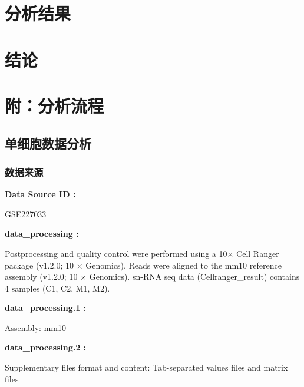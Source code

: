 \documentclass[
]{article}
\begin{document}
\hypertarget{results}{%
\section{分析结果}\label{results}}

\hypertarget{dis}{%
\section{结论}\label{dis}}

\hypertarget{workflow}{%
\section{附：分析流程}\label{workflow}}

\hypertarget{ux5355ux7ec6ux80deux6570ux636eux5206ux6790}{%
\subsection{单细胞数据分析}\label{ux5355ux7ec6ux80deux6570ux636eux5206ux6790}}

\hypertarget{ux6570ux636eux6765ux6e90}{%
\subsubsection{数据来源}\label{ux6570ux636eux6765ux6e90}}

\begin{center}\begin{tcolorbox}[colback=gray!10, colframe=gray!50, width=0.9\linewidth, arc=1mm, boxrule=0.5pt]
\textbf{
Data Source ID
:}

\vspace{0.5em}

    GSE227033

\vspace{2em}


\textbf{
data\_processing
:}

\vspace{0.5em}

    Postprocessing and quality control were performed using
a 10× Cell Ranger package (v1.2.0; 10 × Genomics). Reads
were aligned to the mm10 reference assembly (v1.2.0; 10 ×
Genomics). sn-RNA seq data (Cellranger\_result) contains 4
samples (C1, C2, M1, M2).

\vspace{2em}


\textbf{
data\_processing.1
:}

\vspace{0.5em}

    Assembly: mm10

\vspace{2em}


\textbf{
data\_processing.2
:}

\vspace{0.5em}

    Supplementary files format and content: Tab-separated
values files and matrix files

\vspace{2em}
\end{tcolorbox}
\end{center}
\end{document}
